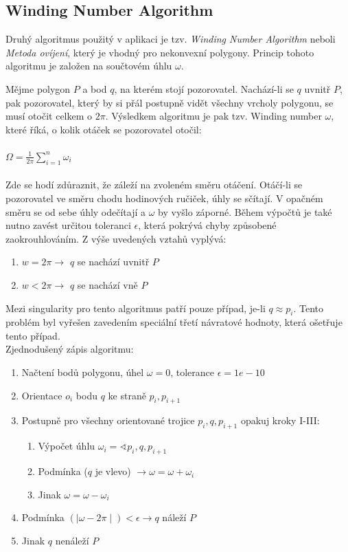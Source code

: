 \documentclass[a4paper, 12pt]{article}
\begin{document}
\subsection{Winding Number Algorithm}
Druhý algoritmus použitý v aplikaci je tzv. \textit{Winding Number Algorithm} neboli \textit{Metoda ovíjení}, který je vhodný pro nekonvexní polygony. Princip tohoto algoritmu je založen na součtovém úhlu $\omega$.

Mějme polygon $P$ a bod $q$, na kterém stojí pozorovatel. Nachází-li se $q$ uvnitř $P$, pak pozorovatel, který by si přál postupně vidět všechny vrcholy polygonu, se musí otočit celkem o $2\pi$. Výsledkem algoritmu je pak tzv. Winding number $\omega$, které říká, o kolik otáček se pozorovatel otočil: \\ \\
$\Omega = \frac{1}{2\pi} \sum_{i=1}^n \omega_i$\\ \\
Zde se hodí zdůraznit, že záleží na zvoleném směru otáčení. Otáčí-li se pozorovatel ve směru chodu hodinových ručiček, úhly se sčítají. V opačném směru se od sebe úhly odečítají a $\omega$ by vyšlo záporné. Během výpočtů je také nutno zavést určitou toleranci $\epsilon$, která pokrývá chyby způsobené zaokrouhlováním.
Z výše uvedených vztahů vyplývá:
\begin{enumerate} 
\item $w = 2\pi \rightarrow$ $q$ se nachází uvnitř $P$
\item  $w < 2\pi \rightarrow$ $q$ se nachází vně $P$
\end{enumerate}

Mezi singularity pro tento algoritmus patří pouze případ, je-li $q\approx p_i$. Tento problém byl vyřešen zavedením speciální třetí návratové hodnoty, která ošetřuje tento případ.\\

Zjednodušený zápis algoritmu:

\begin{enumerate}
\item Načtení bodů polygonu, úhel $\omega = 0$, tolerance $\epsilon = 1e-10$
\item Orientace $o_i$ bodu $q$ ke straně $p_i, p_{i+1}$
\item Postupně pro všechny orientované trojice $p_i, q, p_{i+1}$ opakuj kroky I-III:
\begin{enumerate}[label=\Roman*.]
\item Výpočet úhlu $\omega_i = \sphericalangle p_i, q, p_{i+1}$
\item Podmínka ($q$ je vlevo) $\rightarrow \omega = \omega + \omega_i$
\item Jinak $\omega = \omega - \omega_i$
\end{enumerate}
\item Podmínka $(\mid \omega - 2\pi \mid) < \epsilon \rightarrow q$ náleží $P$
\item Jinak  $q$ nenáleží $P$
\end{enumerate}
\end{document}

